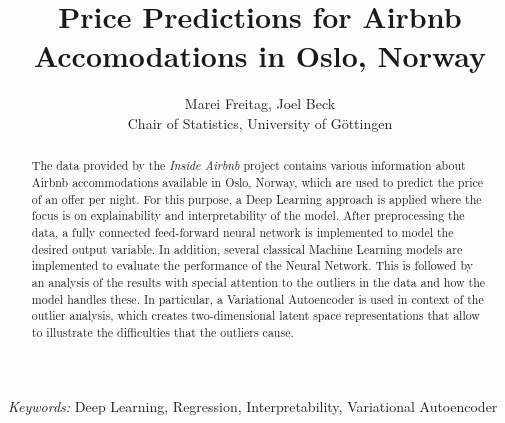 \begin{titlepage}

    \title{\bf Price Predictions for Airbnb Accomodations in Oslo, Norway}

    \author{Marei Freitag, Joel Beck \hspace{.2cm}\\ Chair of Statistics, University of G\"ottingen\\}

    \maketitle

    \bigskip

    \begin{abstract}
        \noindent The data provided by the \emph{Inside Airbnb} project contains various information
        about Airbnb accommodations available in Oslo, Norway, which are used to predict the
        price of an offer per night. For this purpose, a Deep Learning approach is applied
        where the focus is on explainability and interpretability of the model. After
        preprocessing the data, a fully connected feed-forward neural network is implemented
        to model the desired output variable. In addition, several classical Machine Learning models are 
        implemented to evaluate the performance of the Neural Network. This is followed by an analysis of the results
        with special attention to the outliers in the data and how the model handles these. 
        In particular, a Variational Autoencoder is used in context of the outlier
        analysis, which creates two-dimensional latent space representations that allow to
        illustrate the difficulties that the outliers cause.
    \end{abstract}

    \noindent%
    {\it Keywords:}  Deep Learning, Regression, Interpretability, Variational Autoencoder
    \vfill

\end{titlepage}
